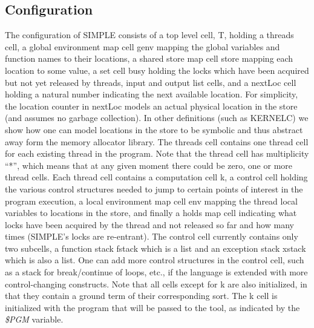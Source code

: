\documentclass{article}
\begin{document}
\begin{kdefinition}
\begin{module}{}
\begin{kblock}[text]
 \section{Configuration}
The \K configuration of SIMPLE consists of a top level cell, \textsf{T},
holding a \textsf{threads} cell, a global environment map cell \textsf{genv}
mapping the global variables and function names to their locations, a shared
store map cell \textsf{store} mapping each location to some value, a set cell
\textsf{busy} holding the locks which have been acquired but not yet released
by threads, \textsf{input} and \textsf{output} list cells, and a
\textsf{nextLoc} cell holding a natural number indicating the next available
location.  For simplicity, the location counter in \textsf{nextLoc} models an
actual physical location in the store (and assumes no garbage collection).
In other definitions (such as KERNELC) we show how one can model locations in
the store to be symbolic and thus abstract away form the memory allocator
library.   The \textsf{threads} cell contains one \textsf{thread} cell for
each existing thread in the program.  Note that the thread cell has
multiplicity ``*'', which means that at any given moment there could be zero,
one or more \textsf{thread} cells.  Each \textsf{thread} cell contains a
computation cell \textsf{k}, a \textsf{control} cell holding the various
control structures needed to jump to certain points of interest in the program
execution, a local environment map cell \textsf{env} mapping the thread local
variables to locations in the store, and finally a \textsf{holds} map cell
indicating what locks have been acquired by the thread and not released so far
and how many times (SIMPLE's locks are re-entrant).  The \textsf{control} cell
currently contains only two subcells, a function stack \textsf{fstack} which
is a list and an exception stack \textsf{xstack} which is also a list.
One can add more control structures in the \textsf{control} cell, such as a
stack for break/continue of loops, etc., if the language is extended with more
control-changing constructs.  Note that all cells except for \textsf{k} are
also initialized, in that they contain a ground term of their corresponding
sort.  The \textsf{k} cell is initialized with the program that will be passed
to the \K tool, as indicated by the \textit{\$PGM} variable. \end{kblock}
\begin{kblock}[text]

\end{kblock}
\end{module}
\end{kdefinition}
\end{document}
